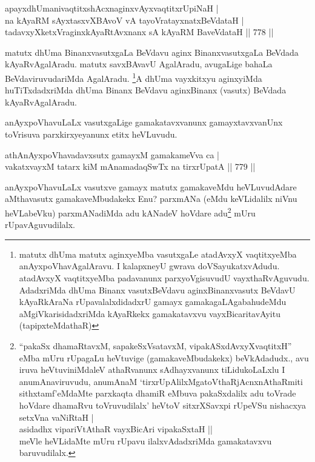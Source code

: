 \begin{shl}
apayxdhUmanivaqtitxshAcxnaginxvAyxvaqtitxrUpiNaH | \\
na kAyaRM sAyxtasxvXBAvoV vA tayoVratayxnatxBeVdataH | \\
tadavxyXketxVraginxkAyaRtAvxnanx sA kAyaRM BaveVdataH \hfill||  778 ||  
\end{shl}

\begin{artha}
matutx dhUma BinanxvasutxgaLa BeVdavu aginx BinanxvasutxgaLa BeVdada kAyaRvAgalAradu. matutx savxBAvavU AgalAradu, avugaLige bahaLa BeVdaviruvudariMda AgalAradu. \footnote{matutx dhUma matutx aginxyeMba vasutxgaLe atadAvxyX vaqtitxyeMba anAyxpoVhavAgalAravu. I kalapxneyU gwrava doVSayukatxvAdudu. atadAvxyX vaqtitxyeMba padavanunx parxyoVgisuvudU vayxthaRvAguvudu. AdadxriMda dhUma Binanx vasutxBeVdavu aginxBinanxvasutx BeVdavU kAyaRkAraNa rUpavalalxdidadxrU gamayx gamakagaLAgabahudeMdu aMgiVkarisidadxriMda kAyaRkekx gamakatavxvu vayxBicaritavAyitu (tapipxteMdathaR)}A dhUma vayxkitxyu aginxyiMda huTiTxdadxriMda dhUma Binanx BeVdavu aginxBinanx (vasutx) BeVdada kAyaRvAgalAradu.
\end{artha}


\begin{artha}
anAyxpoVhavuLaLx vasutxgaLige gamakatavxvanunx gamayxtavxvanUnx toVrisuva parxkirxyeyanunx etitx heVLuvudu.
\end{artha}

\begin{shl}
athAnAyxpoVhavadavxsutx gamayxM gamakameVva ca | \\
vakatxvayxM tatarx kiM mAnamadaqSwTx na tirxrUpatA \hfill||  779 ||  
\end{shl}

\begin{artha}
anAyxpoVhavuLaLx vasutxve gamayx matutx gamakaveMdu heVLuvudAdare aMthavasutx gamakaveMbudakekx Enu? parxmANa (eMdu keVLidalilx niVnu heVLabeVku) parxmANadiMda adu kANadeV hoVdare adu\footnote{``pakaSx dhamaRtavxM, sapakeSxVsatavxM, vipakASxdAvxyXvaqtitxH'' eMba mUru rUpagaLu heVtuvige (gamakaveMbudakekx) beVkAdadudx., avu iruva heVtuviniMdaleV athaRvanunx sAdhayxvanunx tiLidukoLaLxlu I anumAnaviruvudu, anumAnaM `tirxrUpAlilxMgatoV\s thaRjAcnxnAthaRmiti sithxtamf'eMdaMte parxkaqta dhamiR eMbuva pakaSxdalilx adu toVrade hoVdare dhamaRvu toVruvudilalx' heVtoV sitxrXSavxpi rUpeVSu nishacxya setxVna vaNiRtaH |\\
asidadhx vipariVtAthaR vayxBicAri vipakaSxtaH ||\\ meVle heVLidaMte mUru rUpavu ilalxvAdadxriMda gamakatavxvu baruvudilalx.} mUru rUpavAguvudilalx.
\end{artha}

